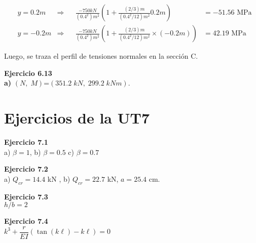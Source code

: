 \begin{align*}
&	y = 0.2m  &\Rightarrow && \frac{-750kN}{(0.4^2)m^2} \left ( 1 + \frac{(2/3)m}{(0.4^2/12)m^2} 0.2m \right )& = -51.56 \text{ MPa}\\
&	y =-0.2m  &\Rightarrow && \frac{-750kN}{(0.4^2)m^2} \left ( 1 + \frac{(2/3)m}{(0.4^2/12)m^2} \times (-0.2m) \right )&= 42.19 \text{ MPa}
\end{align*}

Luego, se traza el perfil de tensiones normales en la sección C.


\begin{center}
	\def\svgwidth{0.5\textwidth}
	
\end{center}

\textbf{Ejercicio 6.13}\\

\textbf{a)}  $(N,\;M)$=$(351.2\;kN,\;299.2\;kNm)$.


\section{Ejercicios de la UT7} 

\textbf{Ejercicio 7.1}\\

a) $\beta = 1$, b) $\beta = 0.5$ c) $\beta = 0.7$\newline

\textbf{Ejercicio 7.2}\\

a) $Q_{cr} = 14.4 $ kN ,  b) $Q_{cr} = 22.7 $ kN, $a=25.4$ cm.\newline



\textbf{Ejercicio 7.3}\\

\indent $h/b = 2$\newline

\textbf{Ejercicio 7.4}\\

\indent $k^3 + \dfrac{r}{EI} \left( \tan(k\ell)-k\ell \right) = 0 $\newline
